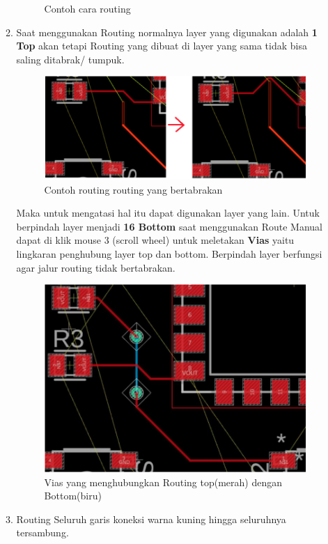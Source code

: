 \begin{enumerate}
\begin{enumerate}
\begin{figure}[H]
            \caption{Contoh cara routing}
        \end{figure}
    \item Saat menggunakan Routing normalnya layer yang digunakan adalah \textbf{1 Top} akan tetapi
    Routing yang dibuat di layer yang sama tidak bisa saling ditabrak/ tumpuk.
        \begin{figure}[H]
            \centering
            \includegraphics[width=0.89\linewidth]{P1/img/routing2.png}
            \caption{Contoh routing routing yang bertabrakan}
        \end{figure}
    Maka untuk mengatasi hal itu dapat digunakan layer yang lain. Untuk berpindah layer
    menjadi \textbf{16 Bottom} saat menggunakan Route Manual dapat di klik mouse 3 (scroll wheel)
    untuk meletakan \textbf{Vias} yaitu lingkaran penghubung layer top dan bottom. Berpindah layer
    berfungsi agar jalur routing tidak bertabrakan.
        \begin{figure}[H]
            \centering
            \includegraphics[width=0.89\linewidth]{P1/img/routing3.png}
            \caption{Vias yang menghubungkan Routing top(merah) dengan Bottom(biru)}
        \end{figure}
    \item Routing Seluruh garis koneksi warna kuning hingga seluruhnya tersambung. \textbf{
}
\end{enumerate}
\end{enumerate}
